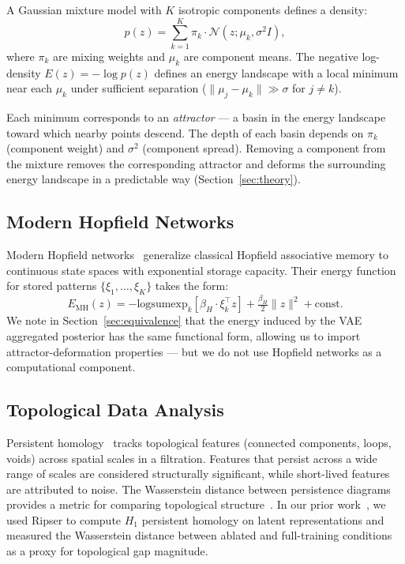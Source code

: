 \documentclass[11pt]{article}
\begin{document}
A Gaussian mixture model with $K$ isotropic components defines a density:
\begin{equation}
p(z) = \sum_{k=1}^{K} \pi_k \cdot \mathcal{N}(z; \mu_k, \sigma^2 I),
\end{equation}
where $\pi_k$ are mixing weights and $\mu_k$ are component means.
The negative log-density $E(z) = -\log p(z)$ defines an energy landscape
with a local minimum near each $\mu_k$ under sufficient separation
($\|\mu_j - \mu_k\| \gg \sigma$ for $j \neq k$).

Each minimum corresponds to an \emph{attractor} --- a basin in the energy
landscape toward which nearby points descend.
The depth of each basin depends on $\pi_k$ (component weight) and $\sigma^2$
(component spread).
Removing a component from the mixture removes the corresponding attractor
and deforms the surrounding energy landscape in a predictable way
(Section~\ref{sec:theory}).


\subsection{Modern Hopfield Networks}
\label{sec:hopfield}

Modern Hopfield networks~\citep{ramsauer2020hopfield} generalize classical
Hopfield associative memory to continuous state spaces with exponential
storage capacity.
Their energy function for stored patterns $\{\xi_1, \ldots, \xi_K\}$ takes
the form:
\begin{equation}
\label{eq:hopfield}
E_{\text{MH}}(z) = -\mathrm{logsumexp}_k[\beta_H \cdot \xi_k^\top z]
  + \tfrac{\beta_H}{2}\|z\|^2 + \text{const.}
\end{equation}
We note in Section~\ref{sec:equivalence} that the energy induced by the
VAE aggregated posterior has the same functional form, allowing us to import
attractor-deformation properties --- but we do not use Hopfield networks
as a computational component.


\subsection{Topological Data Analysis}
\label{sec:tda}

Persistent homology~\citep{edelsbrunner2010computational,carlsson2009topology}
tracks topological features (connected components, loops, voids) across
spatial scales in a filtration.
Features that persist across a wide range of scales are considered
structurally significant, while short-lived features are attributed to noise.
The Wasserstein distance between persistence diagrams provides a metric
for comparing topological structure~\citep{cohen2007stability}.
In our prior work~\citep{rigaud2026gap}, we used Ripser to compute $H_1$
persistent homology on latent representations and measured the Wasserstein
distance between ablated and full-training conditions as a proxy for
topological gap magnitude.
\end{document}

